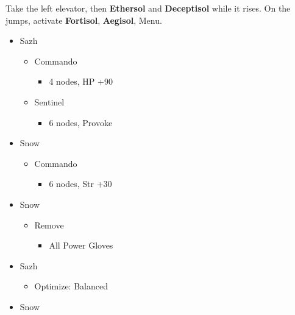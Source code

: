 \begin{multicols}{2}
Take the left elevator, then \textbf{Ethersol} and \textbf{Deceptisol} while it rises. On the jumps, activate \textbf{Fortisol}, \textbf{Aegisol}, Menu.
\vfill
\begin{menu}
\begin{itemize}
        \begin{multicols}{2}
    \crystarium
    \begin{itemize}
        \item Sazh
        \begin{itemize}
            \item Commando
            \begin{itemize}
                \item 4 nodes, HP +90
            \end{itemize}
            \item Sentinel
            \begin{itemize}
                \item 6 nodes, Provoke
            \end{itemize}
        \end{itemize}
        \item Snow
        \begin{itemize}
            \item Commando
            \begin{itemize}
                \item 6 nodes, Str +30
            \end{itemize}
        \end{itemize}
    \end{itemize}
    \equip
    \begin{itemize}
        \item Snow
        \begin{itemize}
            \item Remove
            \begin{itemize}
                \item All Power Gloves
            \end{itemize}
        \end{itemize}
        \item Sazh
        \begin{itemize}
            \item Optimize: Balanced
        \end{itemize}
        \item Snow
        \begin{itemize}

\end{itemize}
\end{itemize}
\end{multicols}
\end{itemize}
\end{menu}
\end{multicols}
